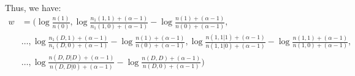\documentclass{amsart}
\theoremstyle{definition}
\begin{document}
\begin{enumerate}[(a)]
\begin{align*}
		\end{align*}
		Thus, we have:
		\begin{align*}
		w &= \bigg(\log \frac{n(1)}{n(0)}, \log \frac{n_1(1, 1) + (\alpha - 1)}{n_1(1, 0) + (\alpha - 1)} - \log \frac{n(1) + (\alpha - 1)}{n(0) + (\alpha - 1)}, \\
		&\ldots, \log \frac{n_1(D, 1) + (\alpha - 1)}{n_1(D, 0) + (\alpha - 1)} - \log \frac{n(1) + (\alpha - 1)}{n(0) + (\alpha - 1)}, \log \frac{n(1, 1| 1) + (\alpha - 1)}{n(1, 1|0) + (\alpha - 1)} - \log \frac{n(1, 1) + (\alpha - 1)}{n(1, 0) + (\alpha - 1)}, \\
		&\ldots, \log \frac{n(D, D|D) + (\alpha - 1)}{n(D, D|0) + (\alpha - 1)} - \log \frac{n(D, D) + (\alpha - 1)}{n(D, 0) + (\alpha - 1)}\bigg)
		\end{align*}
\end{enumerate}
\end{document}

